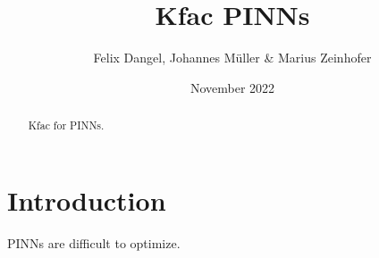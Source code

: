 \documentclass[11pt]{article}
\title{Kfac PINNs }
\date{November 2022}
\author{Felix Dangel, Johannes M\"uller \& Marius Zeinhofer}
\theoremstyle{definition}
\theoremstyle{plain}
\begin{document}
\maketitle

\begin{abstract}
    Kfac for PINNs. 
\end{abstract}
\section{Introduction}
PINNs are difficult to optimize.





\end{document}
